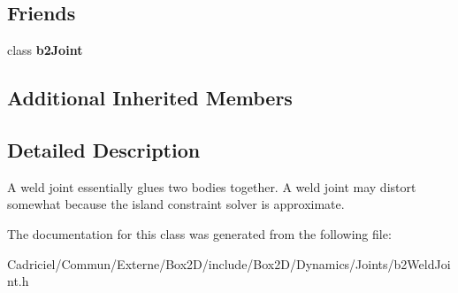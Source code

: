 \subsection*{Friends}
\begin{DoxyCompactItemize}
\item 
class {\bfseries b2\+Joint}\hypertarget{classb2_weld_joint_a54ade8ed3d794298108d7f4c4e4793fa}{}\label{classb2_weld_joint_a54ade8ed3d794298108d7f4c4e4793fa}

\end{DoxyCompactItemize}
\subsection*{Additional Inherited Members}


\subsection{Detailed Description}
A weld joint essentially glues two bodies together. A weld joint may distort somewhat because the island constraint solver is approximate. 

The documentation for this class was generated from the following file\+:\begin{DoxyCompactItemize}
\item 
Cadriciel/\+Commun/\+Externe/\+Box2\+D/include/\+Box2\+D/\+Dynamics/\+Joints/b2\+Weld\+Joint.\+h\end{DoxyCompactItemize}
